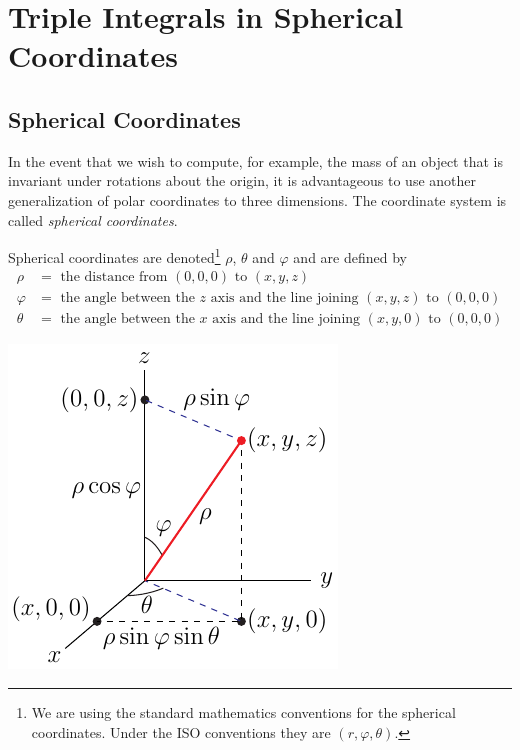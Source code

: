 \section{Triple Integrals in Spherical Coordinates} \label{sec spherical}

\subsection{Spherical Coordinates} \label{sec spherical coords}

In the event that we wish to compute, for example, the mass
of an object that is invariant under rotations about the origin,
it is advantageous to use another generalization of polar coordinates
to three dimensions. The coordinate system is called \emph{spherical
coordinates}. 
\begin{defn}\label{def spherical}
Spherical coordinates are denoted\footnote{We are using the 
standard mathematics conventions for the spherical coordinates.
Under the ISO conventions they are $(r,\varphi,\theta)$.} 
$\rho$, $\theta$ and $\varphi$ and are defined by
\begin{align*}
\rho&=\text{ the distance from }(0,0,0)\text{ to }(x,y,z)\\
\varphi&=\text{ the angle between the $z$ axis and the line joining $(x,y,z)$ to $(0,0,0)$} \\
\theta&=\text{ the angle between the $x$ axis and the line joining $(x,y,0)$ to $(0,0,0)$}
\end{align*}
\begin{efig}
\begin{center}
    \includegraphics{../figs_coord/spherical.pdf}
\end{center}
\end{efig}
\end{defn}
